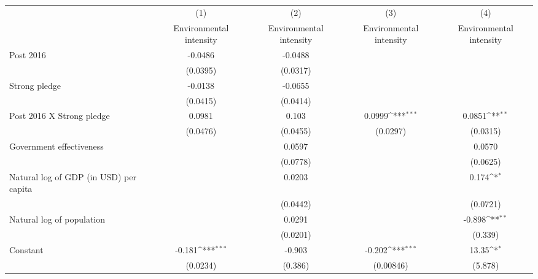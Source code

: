 {
\def\sym#1{\ifmmode^{#1}\else\(^{#1}\)\fi}
\begin{tabular}{l*{4}{c}}
\hline\hline
                    &\multicolumn{1}{c}{(1)}&\multicolumn{1}{c}{(2)}&\multicolumn{1}{c}{(3)}&\multicolumn{1}{c}{(4)}\\
                    &\multicolumn{1}{c}{Environmental intensity}&\multicolumn{1}{c}{Environmental intensity}&\multicolumn{1}{c}{Environmental intensity}&\multicolumn{1}{c}{Environmental intensity}\\
\hline
Post 2016           &     -0.0486         &     -0.0488         &                     &                     \\
                    &    (0.0395)         &    (0.0317)         &                     &                     \\
[1em]
Strong pledge       &     -0.0138         &     -0.0655         &                     &                     \\
                    &    (0.0415)         &    (0.0414)         &                     &                     \\
[1em]
Post 2016 X Strong pledge&      0.0981         &       0.103         &      0.0999\sym{***}&      0.0851\sym{**} \\
                    &    (0.0476)         &    (0.0455)         &    (0.0297)         &    (0.0315)         \\
[1em]
Government effectiveness&                     &      0.0597         &                     &      0.0570         \\
                    &                     &    (0.0778)         &                     &    (0.0625)         \\
[1em]
Natural log of GDP (in USD) per capita&                     &      0.0203         &                     &       0.174\sym{*}  \\
                    &                     &    (0.0442)         &                     &    (0.0721)         \\
[1em]
Natural log of population&                     &      0.0291         &                     &      -0.898\sym{**} \\
                    &                     &    (0.0201)         &                     &     (0.339)         \\
[1em]
Constant            &      -0.181\sym{***}&      -0.903         &      -0.202\sym{***}&       13.35\sym{*}  \\
                    &    (0.0234)         &     (0.386)         &   (0.00846)         &     (5.878)         \\

\end{tabular}}
